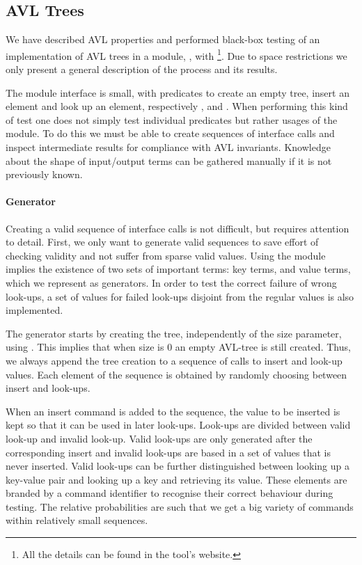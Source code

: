 
\subsection{AVL Trees}

We have described AVL properties and performed black-box testing of an
implementation of AVL trees in a \Yap{} module, , with
\plqc{}\footnote{All the details can be found in the tool's website.}.
Due to space restrictions we only present a general description of the
process and its results. 


The module interface is small, with predicates to create an empty
tree, insert an element and look up an element, respectively
,  and .
%
When performing this kind of test one does not simply test individual
predicates but rather usages of the module.
%
To do this we must be able to create sequences of interface
calls and inspect intermediate results for compliance with AVL
invariants.
%
Knowledge about the shape of input/output terms can be gathered manually
if it is not previously known.


\paragraph{\bf Generator}

Creating a valid sequence of interface calls is not difficult, but
requires attention to detail.
%
First, we only want to generate valid sequences to save effort of
checking validity and not suffer from sparse valid values.
%
Using the  module implies the existence of two sets of important
terms: key terms, and value terms, which we represent as generators.
%
In order to test the correct failure of wrong look-ups, a set of values
for failed look-ups disjoint from the regular values is also
implemented.


The generator starts by creating the tree, independently of the
size parameter, using .
%
This implies that when size is 0 an empty AVL-tree is still created.
%
Thus, we always append the tree creation to a sequence of calls to
insert and look-up values.
%
Each element of the sequence is obtained by randomly choosing between
insert and look-ups.


When an insert command is added to the sequence, the value to be
inserted is kept so that it can be used in later look-ups.
%
Look-ups are divided between valid look-up and invalid look-up.
%
Valid look-ups are only generated after the corresponding insert and
invalid look-ups are based in a set of values that is never inserted.
%
Valid look-ups can be further distinguished between looking up a
key-value pair and looking up a key and retrieving its value.
%
These elements are  branded by a command identifier to recognise their
correct behaviour during testing.
%
The relative probabilities are such that we get a big variety of commands within
relatively small sequences.



